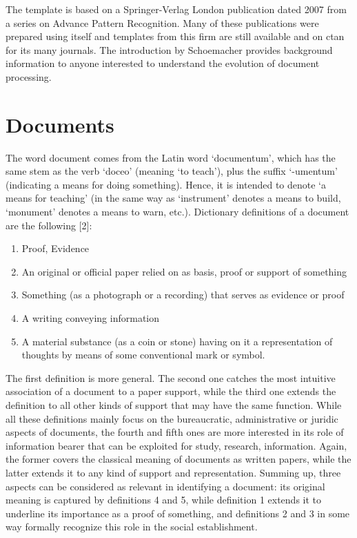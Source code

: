 The template is based on a Springer-Verlag London publication dated 2007 from a series on Advance Pattern Recognition. Many of these publications were prepared using \latex itself and templates from this firm are still available and on ctan for its many journals. The introduction by Schoemacher provides background information to anyone interested to understand the evolution of document processing. 

\section{Documents}

The word document comes from the Latin word ‘documentum’, which has the same
stem as the verb ‘doceo’ (meaning ‘to teach’), plus the suffix ‘-umentum’ (indicating
a means for doing something). Hence, it is intended to denote ‘a means for teaching’
(in the same way as ‘instrument’ denotes a means to build, ‘monument’ denotes a
means to warn, etc.). Dictionary definitions of a document are the following [2]:
\begin{enumerate}
\item Proof, Evidence
\item An original or official paper relied on as basis, proof or support of something
\item Something (as a photograph or a recording) that serves as evidence or proof
\item A writing conveying information
\item A material substance (as a coin or stone) having on it a representation of thoughts
by means of some conventional mark or symbol.
\end{enumerate}

The first definition is more general. The second one catches the most intuitive
association of a document to a paper support, while the third one extends the definition
to all other kinds of support that may have the same function. While all
these definitions mainly focus on the bureaucratic, administrative or juridic aspects
of documents, the fourth and fifth ones are more interested in its role of information
bearer that can be exploited for study, research, information. Again, the former
covers the classical meaning of documents as written papers, while the latter extends
it to any kind of support and representation. Summing up, three aspects can be
considered as relevant in identifying a document: its original meaning is captured
by definitions 4 and 5, while definition 1 extends it to underline its importance as
a proof of something, and definitions 2 and 3 in some way formally recognize this
role in the social establishment.


